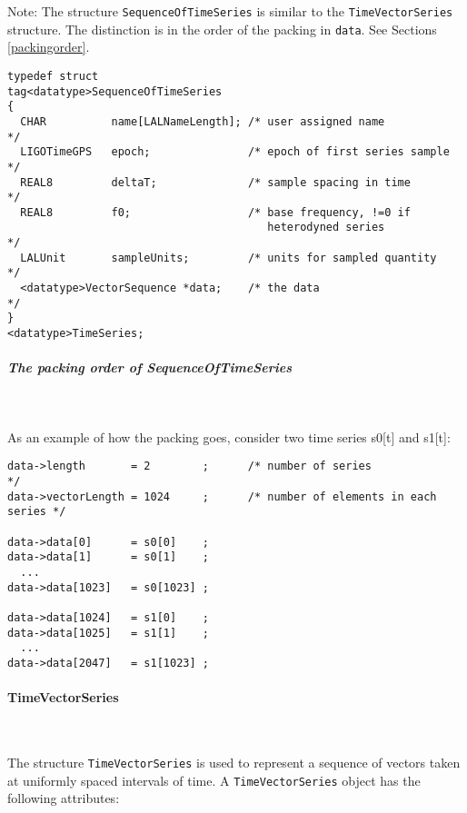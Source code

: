 \documentclass[]{ligodcc}
\renewcommand{\texttt}[1]{{\ttfamily\color{blue}#1}}
\begin{document}
\noindent
Note: The structure {\tt SequenceOfTimeSeries} is similar to the
{\tt TimeVectorSeries} structure. The distinction is in the order of the
packing in {\tt *data}.  See Sections \ref{packingorder}.

{\footnotesize
\begin{verbatim}
typedef struct
tag<datatype>SequenceOfTimeSeries
{
  CHAR          name[LALNameLength]; /* user assigned name           */
  LIGOTimeGPS   epoch;               /* epoch of first series sample */
  REAL8         deltaT;              /* sample spacing in time       */
  REAL8         f0;                  /* base frequency, !=0 if
                                        heterodyned series           */
  LALUnit       sampleUnits;         /* units for sampled quantity   */
  <datatype>VectorSequence *data;    /* the data                     */
}
<datatype>TimeSeries;
\end{verbatim}}

\subparagraph{The packing order of {\texttt {SequenceOfTimeSeries}} }~
\label{packingorder}


\noindent
As an example of how the packing goes, consider two time series s0[t] and s1[t]:

{\footnotesize
\begin{verbatim}
data->length       = 2        ;      /* number of series                  */
data->vectorLength = 1024     ;      /* number of elements in each series */

data->data[0]      = s0[0]    ;
data->data[1]      = s0[1]    ;
  ...
data->data[1023]   = s0[1023] ;

data->data[1024]   = s1[0]    ;
data->data[1025]   = s1[1]    ;
  ...
data->data[2047]   = s1[1023] ;
\end{verbatim}}


\paragraph{{\texttt {TimeVectorSeries}}  }~


The structure {\tt TimeVectorSeries} is used to represent a sequence of
vectors taken at uniformly spaced intervals of time. A
{\tt TimeVectorSeries} object has the following attributes:
\end{document}
